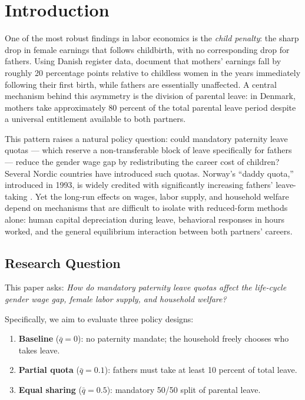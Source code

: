 \section{Introduction}

One of the most robust findings in labor economics is the \textit{child penalty}: the sharp drop in female earnings that follows childbirth, with no corresponding drop for fathers. Using Danish register data, \citet{kleven2019children} document that mothers' earnings fall by roughly 20 percentage points relative to childless women in the years immediately following their first birth, while fathers are essentially unaffected. A central mechanism behind this asymmetry is the division of parental leave: in Denmark, mothers take approximately 80 percent of the total parental leave period despite a universal entitlement available to both partners.

This pattern raises a natural policy question: could mandatory paternity leave quotas --- which reserve a non-transferable block of leave specifically for fathers --- reduce the gender wage gap by redistributing the career cost of children? Several Nordic countries have introduced such quotas. Norway's ``daddy quota,'' introduced in 1993, is widely credited with significantly increasing fathers' leave-taking \citep{patnaik2019reserving}. Yet the long-run effects on wages, labor supply, and household welfare depend on mechanisms that are difficult to isolate with reduced-form methods alone: human capital depreciation during leave, behavioral responses in hours worked, and the general equilibrium interaction between both partners' careers.

\subsection{Research Question}

This paper asks: \textit{How do mandatory paternity leave quotas affect the life-cycle gender wage gap, female labor supply, and household welfare?}

Specifically, we aim to evaluate three policy designs:
\begin{enumerate}
    \item \textbf{Baseline} ($\bar{q} = 0$): no paternity mandate; the household freely chooses who takes leave.
    \item \textbf{Partial quota} ($\bar{q} = 0.1$): fathers must take at least 10 percent of total leave.
    \item \textbf{Equal sharing} ($\bar{q} = 0.5$): mandatory 50/50 split of parental leave.
\end{enumerate}

